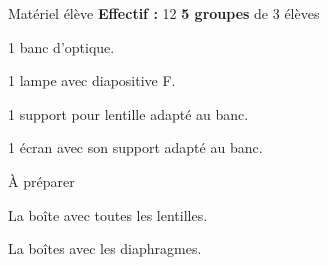 
\begin{boiteMateriel}{Matériel élève}
  \textbf{Effectif :} 12
  \qq{}\qq{}
  \flecheLongue \textbf{5 groupes} de 3 élèves

  \begin{protocole}
    \item 1 banc d'optique.
    \item 1 lampe avec diapositive F.
    \item 1 support pour lentille adapté au banc.
    \item 1 écran avec son support adapté au banc.
  \end{protocole}
\end{boiteMateriel}


\begin{boiteMateriel}{À préparer}
  \begin{protocole}
    \item La boîte avec toutes les lentilles.
    \item La boîtes avec les diaphragmes.
  \end{protocole}
\end{boiteMateriel}